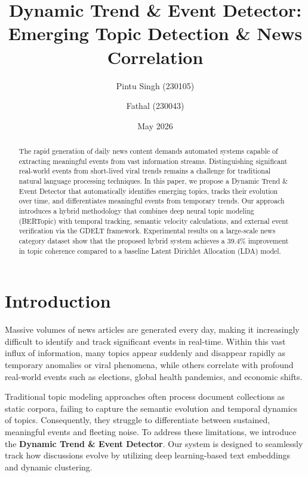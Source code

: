 \documentclass[10pt,twocolumn]{article}
\title{\textbf{Dynamic Trend \& Event Detector: Emerging Topic Detection \& News Correlation}}
\author{Pintu Singh (230105) \and Fathal (230043)}
\date{May 2026}
\begin{document}
\maketitle

\begin{abstract}
The rapid generation of daily news content demands automated systems capable of extracting meaningful events from vast information streams. Distinguishing significant real-world events from short-lived viral trends remains a challenge for traditional natural language processing techniques. In this paper, we propose a Dynamic Trend \& Event Detector that automatically identifies emerging topics, tracks their evolution over time, and differentiates meaningful events from temporary trends. Our approach introduces a hybrid methodology that combines deep neural topic modeling (BERTopic) with temporal tracking, semantic velocity calculations, and external event verification via the GDELT framework. Experimental results on a large-scale news category dataset show that the proposed hybrid system achieves a 39.4\% improvement in topic coherence compared to a baseline Latent Dirichlet Allocation (LDA) model.
\end{abstract}

\section{Introduction}
Massive volumes of news articles are generated every day, making it increasingly difficult to identify and track significant events in real-time. Within this vast influx of information, many topics appear suddenly and disappear rapidly as temporary anomalies or viral phenomena, while others correlate with profound real-world events such as elections, global health pandemics, and economic shifts.

Traditional topic modeling approaches often process document collections as static corpora, failing to capture the semantic evolution and temporal dynamics of topics. Consequently, they struggle to differentiate between sustained, meaningful events and fleeting noise. To address these limitations, we introduce the \textbf{Dynamic Trend \& Event Detector}. Our system is designed to seamlessly track how discussions evolve by utilizing deep learning-based text embeddings and dynamic clustering.
\end{document}

